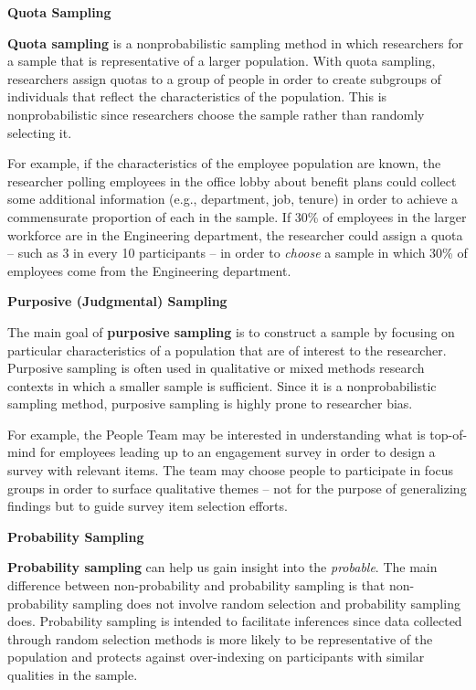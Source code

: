 \documentclass[]{book}
\begin{document}
\textbf{Quota Sampling}

\textbf{Quota sampling} is a nonprobabilistic sampling method in which researchers for a sample that is representative of a larger population. With quota sampling, researchers assign quotas to a group of people in order to create subgroups of individuals that reflect the characteristics of the population. This is nonprobabilistic since researchers choose the sample rather than randomly selecting it.

For example, if the characteristics of the employee population are known, the researcher polling employees in the office lobby about benefit plans could collect some additional information (e.g., department, job, tenure) in order to achieve a commensurate proportion of each in the sample. If 30\% of employees in the larger workforce are in the Engineering department, the researcher could assign a quota -- such as 3 in every 10 participants -- in order to \emph{choose} a sample in which 30\% of employees come from the Engineering department.

\textbf{Purposive (Judgmental) Sampling}

The main goal of \textbf{purposive sampling} is to construct a sample by focusing on particular characteristics of a population that are of interest to the researcher. Purposive sampling is often used in qualitative or mixed methods research contexts in which a smaller sample is sufficient. Since it is a nonprobabilistic sampling method, purposive sampling is highly prone to researcher bias.

For example, the People Team may be interested in understanding what is top-of-mind for employees leading up to an engagement survey in order to design a survey with relevant items. The team may choose people to participate in focus groups in order to surface qualitative themes -- not for the purpose of generalizing findings but to guide survey item selection efforts.

\textbf{Probability Sampling}

\textbf{Probability sampling} can help us gain insight into the \emph{probable}. The main difference between non-probability and probability sampling is that non-probability sampling does not involve random selection and probability sampling does. Probability sampling is intended to facilitate inferences since data collected through random selection methods is more likely to be representative of the population and protects against over-indexing on participants with similar qualities in the sample.
\end{document}
